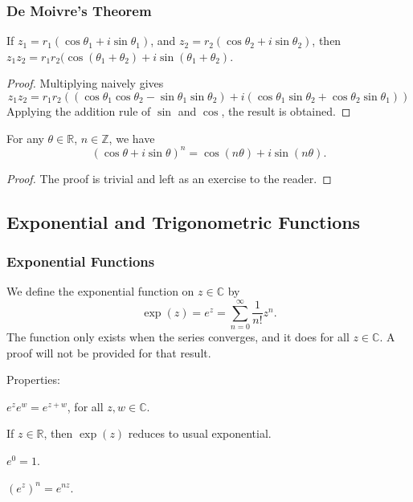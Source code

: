 \documentclass[12pt]{article}
\begin{document}
\subsubsection*{De Moivre's Theorem}

\begin{lemma}
    If $z_{1} = r_{1}(\cos \theta_{1} + i \sin \theta_{1})$,
    and $z_{2} = r_{2}(\cos \theta_{2} + i \sin \theta_{2})$,
    then $z_{1}z_{2} = r_{1}r_{2}(\cos (\theta_{1} + \theta_{2}) + i \sin (\theta_{1} + \theta_{2})$.
\end{lemma}

\begin{proof}
    Multiplying naively gives
    \[
    z_{1}z_{2} = r_{1}r_{2}(
        (\cos\theta_{1} \cos\theta_{2} - \sin\theta_{1}\sin\theta_{2})
        +i(\cos\theta_{1} \sin\theta_{2} + \cos\theta_{2} \sin\theta_{1})
    )
    \]
    Applying the addition rule of $\sin$ and $\cos$, the result is obtained.
\end{proof}

\begin{theorem}[De Moivre's]
    \label{thm:de_moivre}
    For any $\theta \in \mathbb{R}$, $n \in \mathbb{Z}$, we have
    \[
        (\cos\theta + i\sin\theta )^{n} = \cos(n\theta ) + i\sin(n\theta ).
    \]
\end{theorem}
\begin{proof}
    The proof is trivial and left as an exercise to the reader.
\end{proof}

\setcounter{subsection}{3}
\subsection{Exponential and Trigonometric Functions}

\subsubsection{Exponential Functions}

We define the exponential function on $z \in \mathbb{C}$ by
\[
    \exp(z) = e^{z} = \sum\limits_{n=0}^{\infty}\frac{1}{n!}z^{n}.
\]
The function only exists when the series converges,
and it does for all $z \in \mathbb{C}$.
A proof will not be provided for that result.

Properties:
\begin{compactitem}
\item $e^{z}e^{w} = e^{z+w}$, for all $z,w \in \mathbb{C}$.
\item If $z \in \mathbb{R}$, then $\exp(z)$ reduces to usual exponential.
\item $e^{0} = 1$.
\item $(e^{z})^{n} = e^{nz}$.
\end{compactitem}
\end{document}
